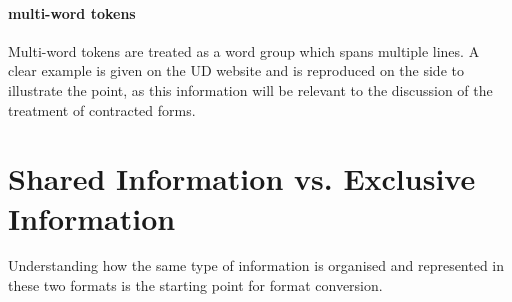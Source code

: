 \paragraph{multi-word tokens}
Multi-word tokens are treated as a word group which spans multiple lines. A clear example is given on the UD website  and is reproduced on the side to illustrate the point, as this information will be relevant to the discussion of the treatment of contracted forms.






\section{Shared Information vs. Exclusive Information}
Understanding how the same type of information is organised and represented in these two formats is the starting point for format conversion.

